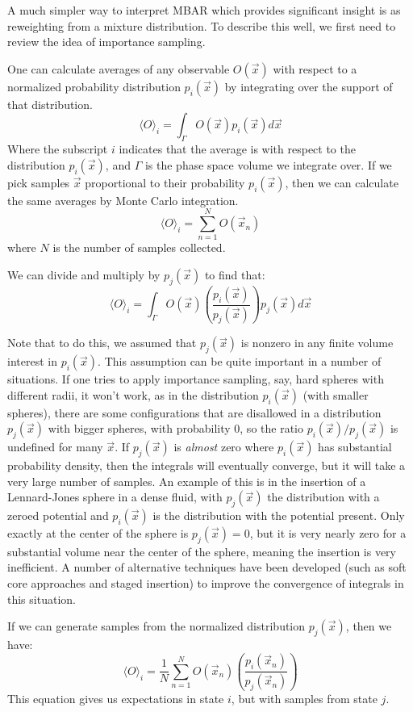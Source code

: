 \documentclass[aps,pre,twocolumn,superscriptaddress]{revtex4-1}
\begin{document}
A much simpler way to interpret MBAR which provides significant
insight is as reweighting from a mixture distribution. To describe
this well, we first need to review the idea of importance sampling.

One can calculate averages of any observable $O(\vec{x})$ with respect
to a normalized probability distribution $p_i(\vec{x})$ by integrating over the
support of that distribution.
\[ \langle O \rangle_{i} = \int_{\Gamma} O(\vec{x}) p_i(\vec{x}) d\vec{x}\]
Where the subscript $i$ indicates that the average is with respect
to the distribution $p_i(\vec{x})$, and $\Gamma$ is the phase space volume
we integrate over. If we pick samples $\vec{x}$ proportional to their
probability $p_i(\vec{x})$, then we can calculate the same averages by
Monte Carlo integration.
\[ \langle O \rangle_{i} = \sum_{n=1}^{N} O(\vec{x}_n) \]
where $N$ is the number of samples collected.

We can divide and multiply by $p_j(\vec{x})$ to find that:
\[ \langle O \rangle_{i} = \int_{\Gamma} O(\vec{x}) \left(\frac{p_i(\vec{x})}{p_j(\vec{x})}\right) p_j(\vec{x}) d\vec{x}\]

Note that to do this, we assumed that $p_j(\vec{x})$ is nonzero in any
finite volume interest in $p_i(\vec{x})$. This assumption can be quite
important in a number of situations. If one tries to apply importance
sampling, say, hard spheres with different radii, it won't work, as in
the distribution $p_i(\vec{x})$ (with smaller spheres), there are some
configurations that are disallowed in a distribution $p_j(\vec{x})$
with bigger spheres, with probability 0, so the ratio
$p_i(\vec{x})/p_j(\vec{x})$ is undefined for many $\vec{x}$.  If
$p_j(\vec{x})$ is {\em almost} zero where $p_i(\vec{x})$ has
substantial probability density, then the integrals will eventually
converge, but it will take a very large number of samples. An example
of this is in the insertion of a Lennard-Jones sphere in a dense
fluid, with $p_j(\vec{x})$ the distribution with a zeroed potential
and $p_i(\vec{x})$ is the distribution with the potential present.
Only exactly at the center of the sphere is $p_j(\vec{x})=0$, but it
is very nearly zero for a substantial volume near the center of the
sphere, meaning the insertion is very inefficient.  A number of
alternative techniques have been developed (such as soft core
approaches and staged insertion) to improve the convergence of
integrals in this situation.

If we can generate samples from the normalized distribution $p_j(\vec{x})$,
then we have:
\[ \langle O \rangle_{i} = \frac{1}{N} \sum_{n=1}^N O(\vec{x}_n) \left(\frac{p_i(\vec{x}_n)}{p_j(\vec{x}_n)}\right) \] 
This equation gives us expectations in state $i$, but with samples
from state $j$.
\end{document}
